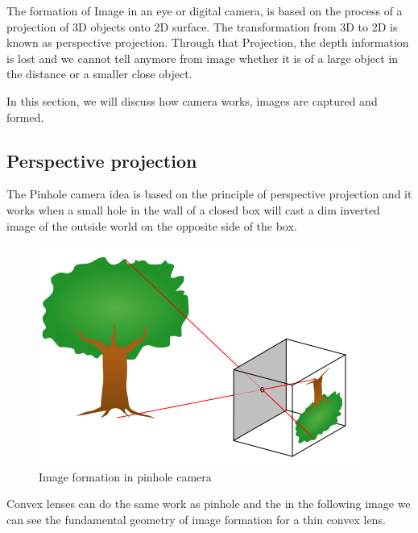 \documentclass[journal,final,a4paper,twoside]{PS}
\begin{document}
The formation of Image in an eye or digital camera, is based on the process of a projection of 3D objects onto 2D surface. The transformation from 3D to 2D is known as perspective projection. Through that Projection, the depth information is lost and we cannot tell anymore from image whether it is of a large object in the distance or a smaller close object.

In this section, we will discuss how camera works, images are captured and formed.

\subsection{Perspective projection}
The Pinhole camera idea is based on the principle of perspective projection and it works when a small hole in the wall of a closed box will cast a dim inverted image of the outside world on the opposite side of the box.
\begin{figure}[h]
\begin{center}
\includegraphics[scale=0.4]{./pics/pinhole.png}
\caption{Image formation in pinhole camera}
\label{fig:pinhole}
\end{center}
\end{figure}
Convex lenses can do the same work as pinhole and the in the following image we can see the fundamental geometry of image formation for a thin convex lens.
\end{document}
